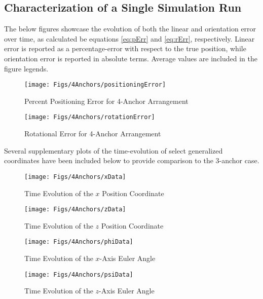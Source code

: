 \documentclass{report}
\begin{document}
			\subsection{Characterization of a Single Simulation Run} \label{4anchor}
				The below figures showcase the evolution of both the linear and orientation error over time, as calculated be equations \ref{eq:pErr} and \ref{eq:rErr}, respectively. Linear error is reported as a percentage-error with respect to the true position, while orientation error is reported in absolute terms. Average values are included in the figure legends.
				\begin{figure}[H]
					\begin{minipage}{0.5\textwidth}
						\centering
						\label{fig:posErr4}
						\texttt{[image: Figs/4Anchors/positioningError]}
						\parbox{0.8\textwidth}{\caption{Percent Positioning Error for 4-Anchor Arrangement}}
					\end{minipage}%
					\begin{minipage}{0.5\textwidth}
						\centering
						\label{fig:rotErr4}
						\texttt{[image: Figs/4Anchors/rotationError]}
						\parbox{0.8\textwidth}{\caption{\centering Rotational Error for 4-Anchor Arrangement}}
					\end{minipage}
				\end{figure}\noindent
				Several supplementary plots of the time-evolution of select generalized coordinates have been included below to provide comparison to the 3-anchor case.
				\begin{figure}[H]
					\centering
					\begin{minipage}{0.5\textwidth}
						\centering
						\texttt{[image: Figs/4Anchors/xData]}
						\parbox{0.8\textwidth}{\caption{\centering Time Evolution of the $x$ Position Coordinate}}
						\label{fig:x4}
					\end{minipage}%
					\begin{minipage}{0.5\textwidth}
						\centering
						\texttt{[image: Figs/4Anchors/zData]}
						\parbox{0.8\textwidth}{\caption{\centering Time Evolution of the $z$ Position Coordinate}}
						\label{fig:z4}
					\end{minipage}
				\end{figure}
				\begin{figure}[H]
					\centering
					\begin{minipage}{0.5\textwidth}
						\centering
						\texttt{[image: Figs/4Anchors/phiData]}
						\parbox{0.8\textwidth}{\caption{\centering Time Evolution of the $x$-Axis Euler Angle}}
						\label{fig:phi4}
					\end{minipage}%
					\begin{minipage}{0.5\textwidth}
						\centering
						\texttt{[image: Figs/4Anchors/psiData]}
						\parbox{0.8\textwidth}{\caption{\centering Time Evolution of the $z$-Axis Euler Angle}}
						\label{fig:psi4}
					\end{minipage}
				\end{figure}
\end{document}
